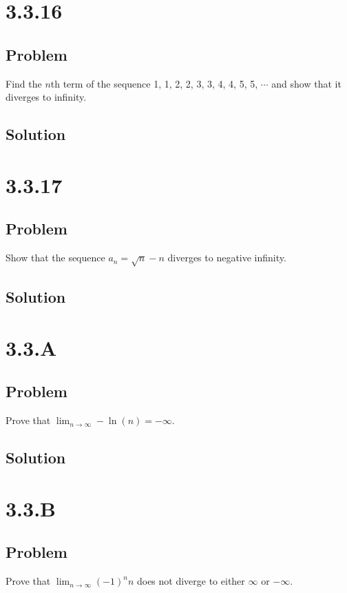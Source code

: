 \documentclass[12pt]{article}
\begin{document}
\section*{3.3.16}

\subsection*{Problem}
Find the $n$th term of the sequence 1, 1, 2, 2, 3, 3, 4, 4, 5, 5, $\cdots$ and show that it diverges to infinity.

\subsection*{Solution}



\section*{3.3.17}

\subsection*{Problem}
Show that the sequence $a_n = \sqrt{n} - n$ diverges to negative infinity.

\subsection*{Solution}



\section*{3.3.A}

\subsection*{Problem}
Prove that $\lim_{n \to \infty} -\ln(n) = -\infty$.

\subsection*{Solution}



\section*{3.3.B}

\subsection*{Problem}
Prove that $\lim_{n \to \infty} (-1)^{n} n$ does not diverge to either $\infty$ or $-\infty$.
\end{document}
